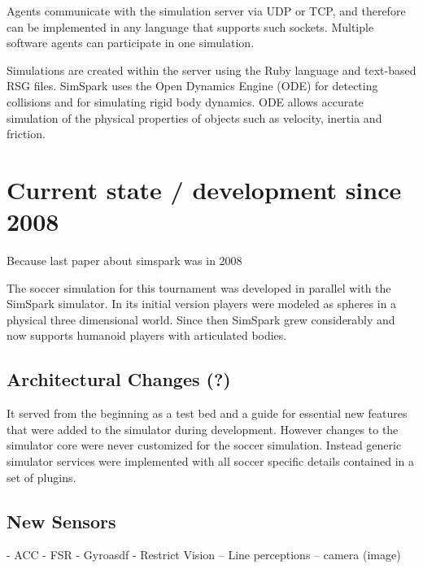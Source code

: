 \documentclass{llncs}
\begin{document}
Agents communicate with the simulation server via UDP or TCP, and therefore can be implemented in any language that supports such sockets.
Multiple software agents can participate in one simulation.

Simulations are created within the server using the Ruby language and text-based RSG files.
SimSpark uses the Open Dynamics Engine (ODE) for detecting collisions and for simulating rigid body dynamics. ODE allows accurate simulation of the physical properties of objects such as velocity, inertia and friction.



\section{Current state / development since 2008}
Because last paper about simspark was in 2008

The soccer simulation for this tournament was developed in parallel with the SimSpark simulator. In its initial version players were modeled as spheres in a physical three dimensional world. Since then SimSpark grew considerably and now supports humanoid players with articulated bodies.

\subsection{Architectural Changes (?)}
It served from the beginning as a test bed and a guide for essential new features that were added to the simulator during development. However changes to the simulator core were never customized for the soccer simulation. Instead generic simulator services were implemented with all soccer specific details contained in a set of plugins.


\subsection{New Sensors}
 - ACC
 - FSR
 - Gyroasdf
 - Restrict Vision
 -- Line perceptions
 -- camera (image)

\end{document}
